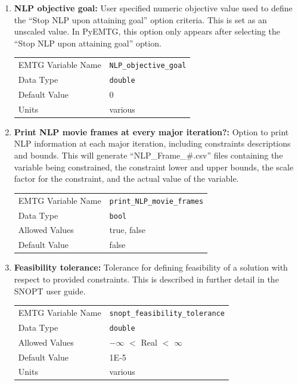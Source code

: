\begin{enumerate}
    \item \textbf{\ac{NLP} objective goal:} User specified numeric objective value used to define the ``Stop \ac{NLP} upon attaining goal'' option criteria. This is set as an unscaled value. In PyEMTG, this option only appears after selecting the ``Stop \ac{NLP} upon attaining goal'' option.
        \begin{table}[H]
            \hspace{2cm}
            \begin{tabular}{lp{5cm}}
            \ac{EMTG} Variable Name & \verb|NLP_objective_goal| \\
            Data Type & \verb|double| \\
            Default Value & 0 \\
            Units & various
            \end{tabular}
        \end{table}

    \item \textbf{Print \ac{NLP} movie frames at every major iteration?:} Option to print \ac{NLP} information at each major iteration, including constraints descriptions and bounds. This will generate ``\ac{NLP}\_Frame\_\#.csv'' files containing the variable being constrained, the constraint lower and upper bounds, the scale factor for the constraint, and the actual value of the variable.
        \begin{table}[H]
            \hspace{2cm}
            \begin{tabular}{lp{5cm}}
            \ac{EMTG} Variable Name & \verb|print_NLP_movie_frames| \\
            Data Type & \verb|bool| \\
            Allowed Values & true, false \\
            Default Value & false \\
            \end{tabular}
        \end{table}

    \item \textbf{Feasibility tolerance:} Tolerance for defining feasibility of a solution with respect to provided constraints. This is described in further detail in the \ac{SNOPT} user guide.
    \begin{table}[H]
        \hspace{2cm}
        \begin{tabular}{lp{5cm}}
        \ac{EMTG} Variable Name & \verb|snopt_feasibility_tolerance| \\
        Data Type & \verb|double| \\
        Allowed Values & $-\infty$ $<$ Real $<$ $\infty$ \\
        Default Value & 1E-5 \\
        Units & various
        \end{tabular}
    \end{table}
    

\end{enumerate}
